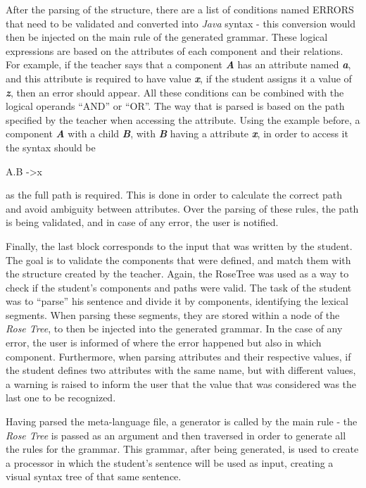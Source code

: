 After the parsing of the structure, there are a list of conditions named ERRORS that need to be validated and converted into \emph{Java} syntax - this conversion would then be injected on the main rule of the generated grammar. These logical expressions are based on the attributes of each component and their relations. For example, if the teacher says that a component \emph{\textbf{A}} has an attribute named \emph{\textbf{a}}, and this attribute is required to have value \emph{\textbf{x}}, if the student assigns it a value of \emph{\textbf{z}}, then an error should appear. All these conditions can be combined with the logical operands ``AND'' or ``OR''. The way that is parsed is based on the path specified by the teacher when accessing the attribute. Using the example before, a component \emph{\textbf{A}} with a child \emph{\textbf{B}}, with \emph{\textbf{B}} having a attribute \emph{\textbf{x}}, in order to access it the syntax should be

A.B -\textgreater x

\noindent as the full path is required. This is done in order to calculate the correct path and avoid ambiguity between attributes. Over the parsing of these rules, the path is being validated, and in case of any error, the user is notified.

Finally, the last block corresponds to the input that was written by the student. The goal is to validate the components that were defined, and match them with the structure created by the teacher. Again, the RoseTree was used as a way to check if the student’s components and paths were valid. The task of the student was to ``parse'' his sentence and divide it by components, identifying the lexical segments. When parsing these segments, they are stored within a node of the \emph{Rose Tree}, to then be injected into the generated grammar. In the case of any error, the user is informed of where the error happened but also in which component. Furthermore, when parsing attributes and their respective values, if the student defines two attributes with the same name, but with different values, a warning is raised to inform the user that the value that was considered was the last one to be recognized. 

Having parsed the meta-language file, a generator is called by the main rule - the \emph{Rose Tree} is passed as an argument and then traversed in order to generate all 
the rules for the grammar. This grammar, after being generated, is used to create a processor in which the student's sentence will be used as input, creating a visual 
syntax tree of that same sentence.
